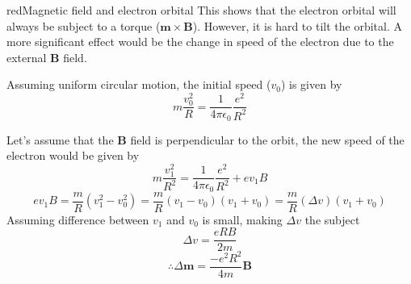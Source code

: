 \begin{mybox}{red}{Magnetic field and electron orbital}
    This shows that the electron orbital will always be subject to a torque ($\mathbf{m} \times \mathbf{B}$). However, it is hard to tilt the orbital. A more significant effect would be the change in speed of the electron due to the external $\mathbf{B}$ field.

    Assuming uniform circular motion, the initial speed ($v_0$) is given by
    \begin{equation}
        m \frac{v_0^2}{R}=\frac{1}{4\pi\epsilon_0}\frac{e^2}{R^2}
    \end{equation}

    Let's assume that the  $\mathbf{B}$ field is perpendicular to the orbit, the new speed of the electron would be given by
    \begin{equation}
        m \frac{v_1^2}{R^2}=\frac{1}{4\pi\epsilon_0}\frac{e^2}{R^2}+ev_1B
    \end{equation}
    \begin{equation}
        ev_1B=\frac{m}{R}(v_1^2-v_0^2)=\frac{m}{R}(v_1-v_0)(v_1+v_0)=\frac{m}{R}(\Delta v)(v_1+v_0)
    \end{equation}
    Assuming difference between $v_1$ and $v_0$ is small, making $\Delta v$ the subject
    \begin{equation}
        \Delta v = \frac{eRB}{2m}
    \end{equation}
    \begin{equation}
        \boxed{\therefore \Delta \mathbf{m}=\frac{-e^2 R^2}{4m} \mathbf{B}}
    \end{equation}
\end{mybox}

